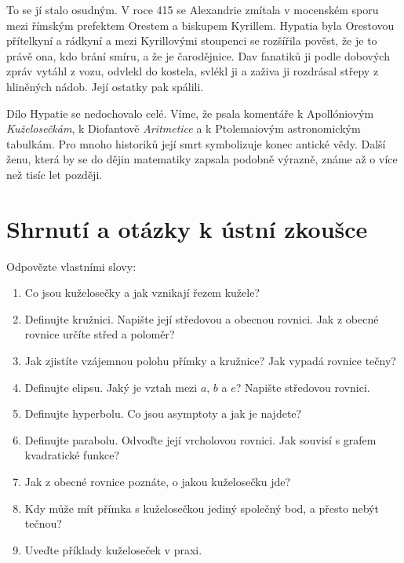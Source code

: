 To se jí stalo osudným. V roce 415 se Alexandrie zmítala v mocenském sporu mezi římským prefektem Orestem a biskupem Kyrillem. Hypatia byla Orestovou přítelkyní a rádkyní a mezi Kyrillovými stoupenci se rozšířila pověst, že je to právě ona, kdo brání smíru, a že je čarodějnice. Dav fanatiků ji podle dobových zpráv vytáhl z vozu, odvlekl do kostela, svlékl ji a zaživa ji rozdrásal střepy z hliněných nádob. Její ostatky pak spálili.

Dílo Hypatie se nedochovalo celé. Víme, že psala komentáře k Apollóniovým \textit{Kuželosečkám}, k Diofantově \textit{Aritmetice} a k Ptolemaiovým astronomickým tabulkám. Pro mnoho historiků její smrt symbolizuje konec antické vědy. Další ženu, která by se do dějin matematiky zapsala podobně výrazně, známe až o více než tisíc let později.

\section{Shrnutí a otázky k ústní zkoušce}

\begin{problem}
  Odpovězte vlastními slovy:
  \begin{enumerate}
    \item Co jsou kuželosečky a jak vznikají řezem kužele?
    \item Definujte kružnici. Napište její středovou a obecnou rovnici. Jak z obecné rovnice určíte střed a poloměr?
    \item Jak zjistíte vzájemnou polohu přímky a kružnice? Jak vypadá rovnice tečny?
    \item Definujte elipsu. Jaký je vztah mezi $a$, $b$ a $e$? Napište středovou rovnici.
    \item Definujte hyperbolu. Co jsou asymptoty a jak je najdete?
    \item Definujte parabolu. Odvoďte její vrcholovou rovnici. Jak souvisí s grafem kvadratické funkce?
    \item Jak z obecné rovnice poznáte, o jakou kuželosečku jde?
    \item Kdy může mít přímka s kuželosečkou jediný společný bod, a přesto nebýt tečnou?
    \item Uveďte příklady kuželoseček v praxi.
  \end{enumerate}
\end{problem}
